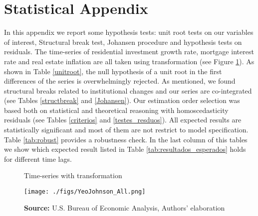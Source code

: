 \documentclass[12pt, a4paper]{article}
\begin{document}
\appendix
\section{Statistical Appendix}
\label{sec:org1ad89f4}
\label{appen:A}

In this appendix we report some hypothesis tests: unit root tests on our variables of interest, Structural break test, Johansen procedure and hypothesis tests on residuals.
The time-series of residential investment growth rate, mortgage interest rate and real estate inflation are all taken using \textcite{yeo_new_2000} transformation (see Figure \ref{YeoJhonson}).
As shown in Table \ref{unitroot}, the null hypothesis of a unit root in the first differences of the series is overwhelmingly rejected.
As mentioned, we found structural breaks related to institutional changes and our series are co-integrated (see Tables \ref{structbreak} and \ref{Johansen}).
Our estimation order selection was based both on statistical and theoretical reasoning with homoscedasticity residuals (see Tables \ref{criterios} and \ref{testes_resduos}).
All expected results are statistically significant and most of them are not restrict to model specification.
Table \ref{tab:robust} provides a robustness check.
In the last column of this tables we show which expected result listed in Table \ref{tab:resultados_esperados} holds for different time lags.

\begin{figure}[htb]
	\centering
	\caption{Time-series with \textcite{yeo_new_2000} transformation}
	\label{YeoJhonson}
	\texttt{[image: ./figs/YeoJohnson\_All.png]}
	\caption*{\textbf{Source:} U.S. Bureau of Economic Analysis, Authors' elaboration}
\end{figure}






\end{document}
